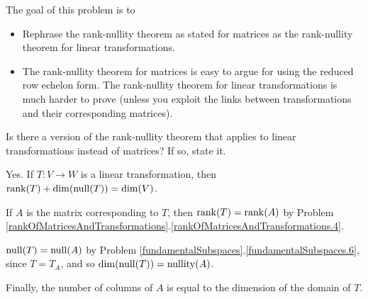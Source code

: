 	\question
	\begin{annotation}
		\begin{goals}

			The goal of this problem is to
			\begin{itemize}
				\item Rephrase the rank-nullity theorem as stated for matrices as
					the rank-nullity theorem for linear transformations.
			\end{itemize}
		\end{goals}

		\begin{notes}
			\begin{itemize}
				\item The rank-nullity theorem for matrices is easy to argue for using
					the reduced row echelon form. The rank-nullity theorem for 
					linear transformations is much harder to prove (unless you exploit
					the links between transformations and their corresponding matrices).
			\end{itemize}
		\end{notes}
	\end{annotation}
	\begin{parts}
		\item Is there a version of the rank-nullity theorem that applies to linear
			transformations instead of matrices? If so, state it.
			\begin{solution}
				Yes. If $T:V\to W$ is a linear transformation, then
				$\operatorname{rank}(T)+\operatorname{dim}(\operatorname{null}(T))=\operatorname{dim}(V)$.

				If $A$ is the matrix corresponding to $T$, then $\operatorname{rank}(T)=\operatorname{rank}(A)$
				by Problem \ref{rankOfMatricesAndTransformations}.\ref{rankOfMatricesAndTransformations.4}.

				$\operatorname{null}(T)=\operatorname{null}(A)$ by Problem \ref{fundamentalSubspaces}.\ref{fundamentalSubspaces.6},
				since $T=T_A$, and so $\operatorname{dim}(\operatorname{null}(T))=\operatorname{nullity}(A)$.

				Finally, the number of columns of $A$ is equal to the dimension
				of the domain of $T$.
			\end{solution}
	\end{parts}

